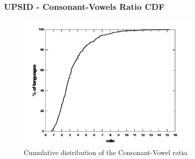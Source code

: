 \documentclass[notes]{beamer}
\begin{document}
\frame
{
  \frametitle{UPSID - Consonant-Vowels Ratio CDF}
  \vspace{-0.3cm}
  \begin{figure}[h!]
  \centering
  \includegraphics[width=0.8\textwidth]{images/cdf_cv_ratio.pdf}
  \caption{Cumulative distribution of the Consonant-Vowel ratio.}
  \label{fig:cdf_cv_ratio}
  \end{figure}
}
\end{document}

